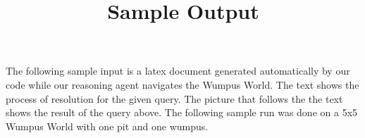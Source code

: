 \documentclass[10pt,a4paper]{article}
\title{Sample Output}
\begin{document}
	\maketitle
	The following sample input is a latex document generated automatically by our code while our reasoning agent navigates the Wumpus World. The text shows the process of resolution for the given query. The picture that follows the the text shows the result of the query above. The following sample run was done on a 5x5 Wumpus World with one pit and one wumpus.
	
	\tiny
	\noindent
	
	
	
\end{document}
